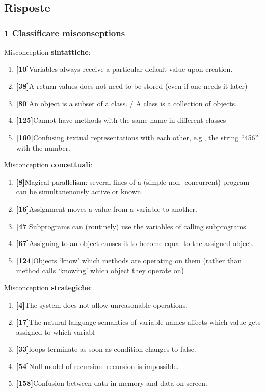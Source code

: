 \documentclass[a4paper]{article}
\begin{document}
\subsection{Risposte}
\subsubsection{1 Classificare misconseptions}
Misconception \textbf{sintattiche}:
\begin{enumerate}
	\item \textbf{[10]}Variables always receive a particular default value upon creation.
	\item \textbf{[38]}A return values does not need to be stored (even if one needs it later)
	\item \textbf{[80]}An object is a subset of a class. / A class is a collection of objects.
	\item \textbf{[125]}Cannot have methods with the same name in different classes
	\item \textbf{[160]}Confusing textual representations with each other, e.g., the string “456” with the number.

\end{enumerate}
Misconception \textbf{concettuali}:
\begin{enumerate}
	\item \textbf{[8]}Magical parallelism: several lines of a (simple non- concurrent) program can be simultanenously active or known.
	\item \textbf{[16]}Assignment moves a value from a variable to another.
	\item \textbf{[47]}Subprograms can (routinely) use the variables of calling subprograms.
	\item \textbf{[67]}Assigning to an object causes it to become equal to the assigned object.
	\item \textbf{[124]}Objects ‘know’ which methods are operating on them (rather than method calls ‘knowing’ which object they operate on)
\end{enumerate}
Misconception \textbf{strategiche}:
\begin{enumerate}
	\item \textbf{[4]}The system does not allow unreasonable operations.
	\item \textbf{[17]}The natural-language semantics of variable names affects which value gets assigned to which variabl
	\item \textbf{[33]}loops terminate as soon as condition changes to false.
	\item \textbf{[54]}Null model of recursion: recursion is impossible.
	\item \textbf{[158]}Confusion between data in memory and data on screen.
\end{enumerate}
\end{document}
